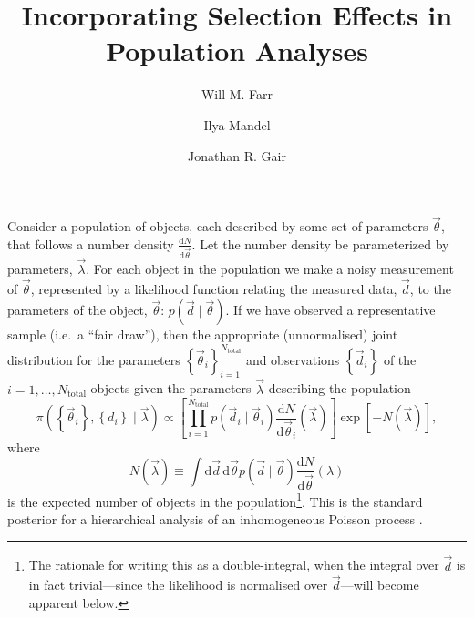 \documentclass[modern]{aastex62}
\newcommand{\dd}{\mathrm{d}}
\newcommand{\diff}[2]{\frac{\dd #1}{\dd #2}}
\newcommand{\Ntotal}{N_\mathrm{total}}
\newcommand{\vd}{\vec{d}}
\newcommand{\vlambda}{\vec{\lambda}}
\newcommand{\vtheta}{\vec{\theta}}
\begin{document}
\title{Incorporating Selection Effects in Population Analyses}

\author[0000-0003-1540-8562]{Will M. Farr}

\author[0000-0002-6134-8946]{Ilya Mandel}

\author{Jonathan R. Gair}

\section*{}

Consider a population of objects, each described by some set of parameters
$\vtheta$, that follows a number density $\diff{N}{\vtheta}$.  Let the number
density be parameterized by parameters, $\vlambda$.  For each object in the
population we make a noisy measurement of $\vtheta$, represented by a likelihood
function relating the measured data, $\vd$, to the parameters of the object,
$\vtheta$: $p\left( \vd \mid \vtheta \right)$.  If we have observed a
representative sample (i.e.\ a ``fair draw''), then the appropriate
(unnormalised) joint distribution for the parameters $\left\{ \vtheta_i
\right\}_{i=1}^{\Ntotal}$ and observations $\left\{ \vd_i \right\}$ of the $i =
1, \ldots, \Ntotal$ objects given the parameters $\vlambda$ describing the
population
%
\begin{equation}
  \pi\left(\left\{ \vtheta_i \right\}, \left\{ d_i \right\} \mid \vlambda \right) \propto \left[ \prod_{i=1}^{\Ntotal} p\left( \vd_i \mid \vtheta_i \right) \diff{N}{\vtheta_i}\left( \vlambda \right) \right] \exp\left[ - N\left( \vlambda \right) \right],
\end{equation}
%
where
%
\begin{equation}
N\left( \vlambda \right) \equiv \int \dd \vd \, \dd \vtheta p\left( \vd \mid \vtheta \right) \diff{N}{\vtheta}\left( \lambda \right)
\end{equation}
%
is the expected number of objects in the population\footnote{The rationale for
writing this as a double-integral, when the integral over $\vd$ is in fact
trivial---since the likelihood is normalised over $\vd$---will become apparent
below.}.  This is the standard posterior for a hierarchical analysis of an
inhomogeneous Poisson process
\citep{Loredo1995,Hogg2010,Mandel2010,Youdin2011,Foreman-Mackey2014,Farr2015,Barrett2018}.
\end{document}
